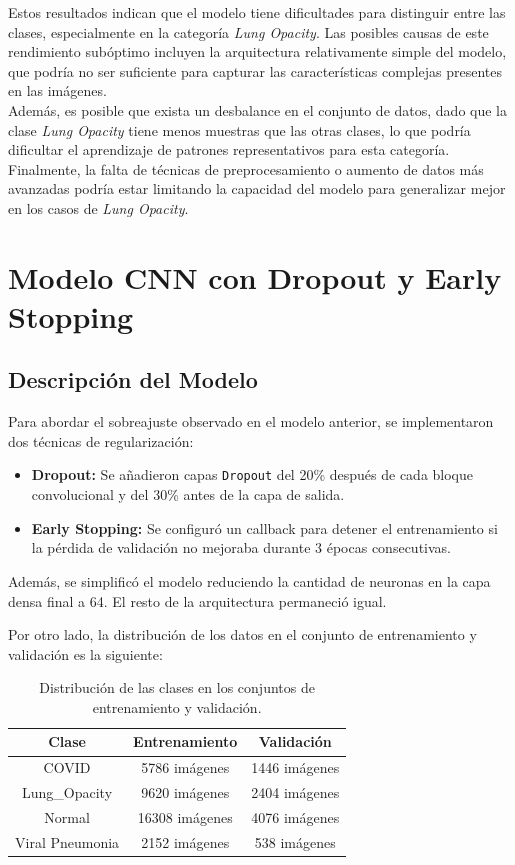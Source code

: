 \documentclass{article}
\begin{document}
Estos resultados indican que el modelo tiene dificultades para distinguir entre las clases, especialmente en la categoría \textit{Lung Opacity}. Las posibles causas de este rendimiento subóptimo incluyen la arquitectura relativamente simple del modelo, que podría no ser suficiente para capturar las características complejas presentes en las imágenes. 
\\

Además, es posible que exista un desbalance en el conjunto de datos, dado que la clase \textit{Lung Opacity} tiene menos muestras que las otras clases, lo que podría dificultar el aprendizaje de patrones representativos para esta categoría. Finalmente, la falta de técnicas de preprocesamiento o aumento de datos más avanzadas podría estar limitando la capacidad del modelo para generalizar mejor en los casos de \textit{Lung Opacity}.
	
	\section{Modelo CNN con Dropout y Early Stopping}
	
	\subsection{Descripción del Modelo}
	
	Para abordar el sobreajuste observado en el modelo anterior, se implementaron dos técnicas de regularización:
	\begin{itemize}
		\item \textbf{Dropout:} Se añadieron capas \texttt{Dropout} del 20\% después de cada bloque convolucional y del 30\% antes de la capa de salida.
		\item \textbf{Early Stopping:} Se configuró un callback para detener el entrenamiento si la pérdida de validación no mejoraba durante 3 épocas consecutivas.
	\end{itemize}
	
	Además, se simplificó el modelo reduciendo la cantidad de neuronas en la capa densa final a 64. El resto de la arquitectura permaneció igual.
	
	Por otro lado, la distribución de los datos en el conjunto de entrenamiento y validación es la siguiente:
	
	\begin{table}[h!]
		\centering
		\begin{tabular}{c c c}
			\hline
			\textbf{Clase} & \textbf{Entrenamiento} & \textbf{Validación} \\
			\hline
			COVID & 5786 imágenes & 1446 imágenes \\
			Lung\_Opacity & 9620 imágenes & 2404 imágenes \\
			Normal & 16308 imágenes & 4076 imágenes \\
			Viral Pneumonia & 2152 imágenes & 538 imágenes \\
			\hline
		\end{tabular}
		\caption{Distribución de las clases en los conjuntos de entrenamiento y validación.}
	\end{table}
\end{document}
